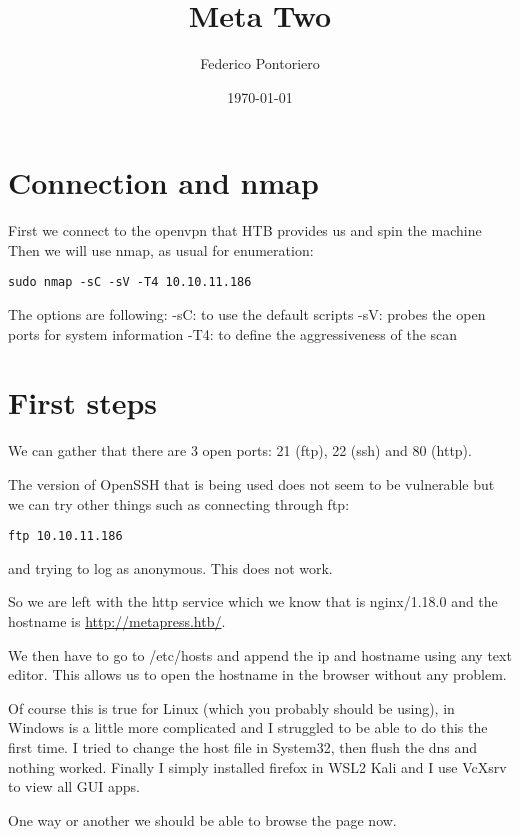 \documentclass[11pt]{article}
\author{Federico Pontoriero}
\date{\today}
\title{Meta Two}
\begin{document}
\maketitle
\tableofcontents


\section{Connection and nmap}
\label{sec:orga5dee41}
First we connect to the openvpn that HTB provides us and spin the machine
Then we will use nmap, as usual for enumeration:

\begin{verbatim}
sudo nmap -sC -sV -T4 10.10.11.186
\end{verbatim}

The options are following:
-sC: to use the default scripts
-sV: probes the open ports for system information
-T4: to define the aggressiveness of the scan

\section{First steps}
\label{sec:org9c3964f}

We can gather that there are 3 open ports: 21 (ftp), 22 (ssh) and 80 (http).

The version of OpenSSH that is being used does not seem to be vulnerable but
we can try other things such as connecting through ftp:

\begin{verbatim}
ftp 10.10.11.186
\end{verbatim}

and trying to log as anonymous. This does not work.

So we are left with the http service which we know that is nginx/1.18.0 and the
hostname is \url{http://metapress.htb/}.

We then have to go to /etc/hosts and append the ip and hostname using any text
editor.
This allows us to open the hostname in the browser without any problem.

Of course this is true for Linux (which you probably should be using), in Windows is
a little more complicated and I struggled to be able to do this the first time. I
tried to change the host file in System32, then flush the dns and nothing worked.
Finally I simply installed firefox in WSL2 Kali and I use VcXsrv to view all GUI
apps.

One way or another we should be able to browse the page now.
\end{document}
